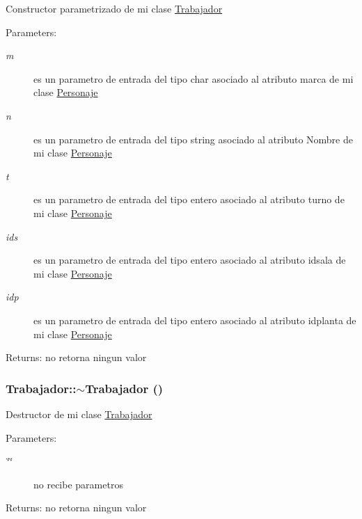 Constructor parametrizado de mi clase \hyperlink{classTrabajador}{Trabajador} \begin{Desc}
\item[Parameters:]
\begin{description}
\item[{\em m}]es un parametro de entrada del tipo char asociado al atributo marca de mi clase \hyperlink{classPersonaje}{Personaje} \item[{\em n}]es un parametro de entrada del tipo string asociado al atributo Nombre de mi clase \hyperlink{classPersonaje}{Personaje} \item[{\em t}]es un parametro de entrada del tipo entero asociado al atributo turno de mi clase \hyperlink{classPersonaje}{Personaje} \item[{\em ids}]es un parametro de entrada del tipo entero asociado al atributo idsala de mi clase \hyperlink{classPersonaje}{Personaje} \item[{\em idp}]es un parametro de entrada del tipo entero asociado al atributo idplanta de mi clase \hyperlink{classPersonaje}{Personaje} \end{description}
\end{Desc}
\begin{Desc}
\item[Returns:]no retorna ningun valor \end{Desc}
\hypertarget{classTrabajador_aa31c7df293b6d054e0e41e4b0e27412}{
\subsubsection[$\sim$Trabajador]{\setlength{\rightskip}{0pt plus 5cm}Trabajador::$\sim$Trabajador ()}}
\label{classTrabajador_aa31c7df293b6d054e0e41e4b0e27412}


Destructor de mi clase \hyperlink{classTrabajador}{Trabajador} \begin{Desc}
\item[Parameters:]
\begin{description}
\item[{\em \char`\"{}\char`\"{}}]no recibe parametros \end{description}
\end{Desc}
\begin{Desc}
\item[Returns:]no retorna ningun valor \end{Desc}


